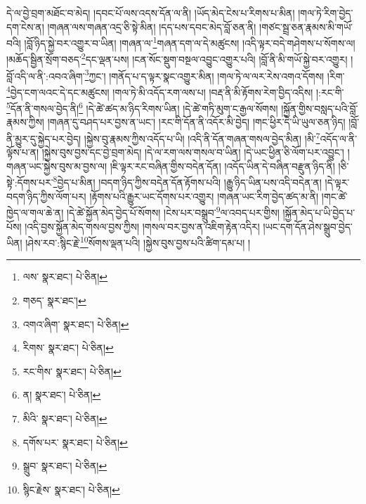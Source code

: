 དེ་ལ་བྱེ་བྲག་མཐོང་བ་མེད། །དབང་པོ་ལས་འདས་དོན་ལ་ནི། །ཡོད་མེད་ངེས་པ་རིགས་པ་མིན། །གལ་ཏེ་རིག་བྱེད་དག་ངེས་ན། །གཞན་ལས་གཞན་འདྲ་ཅི་སྟེ་མིན། །དད་པས་དབང་མེད་བློ་ཅན་ནི། །གཙང་སྦྲ་ཅན་རྣམས་མི་གཡོ་བའི། །བློ་ཉིད་སྐྱེ་བར་འགྱུར་བ་ཡིན། །གཞན་ལ་\footnote{ལས་  སྣར་ཐང་།  པེ་ཅིན། }གཞན་དག་ལ་དེ་མཚུངས། །འདི་ལྟར་བདེ་གཤེགས་པ་སོགས་ལ། །མཆོད་སྦྱིན་སྲོག་བཅད་\footnote{གཅད་  སྣར་ཐང་། }དང་ལྡན་པས། །ངན་སོང་སྡུག་བསྔལ་འབྱུང་འགྱུར་པའི། །བློ་ནི་མི་གཡོ་སྐྱེ་བར་འགྱུར། །བློ་འདི་ལ་ནི་:འབའ་ཞིག་\footnote{འགའ་ཞིག་  སྣར་ཐང་།  པེ་ཅིན། }ཀྱང་། །གནོད་པ་ད་ལྟར་སྣང་འགྱུར་མིན། །གལ་ཏེ་ལ་ལར་རེས་འགའ་དོགས། །རིག་\footnote{རིགས་  སྣར་ཐང་།  པེ་ཅིན། }བྱེད་ངག་ལའང་དེ་དང་མཚུངས། །གལ་ཏེ་མི་འདོད་རག་ལས་པ། །བརྡ་ནི་མི་རྟོགས་རེག་བྱིད་འདིས། །:རང་གི་\footnote{རང་གིས་  སྣར་ཐང་།  པེ་ཅིན། }དོན་ནི་གསལ་བྱེད་ནི།\footnote{ན།  སྣར་ཐང་།  པེ་ཅིན། } །དེ་ཚེ་ཚད་མ་ཉིད་རིགས་ཡིན། །དེ་ཚེ་གཏི་མུག་ང་རྒྱལ་སོགས། །སྐྱོན་གྱིས་བསླད་པའི་བློ་རྣམས་ཀྱིས། །གཞན་དུ་བཤད་པར་བྱས་ན་ཡང་། །རང་གི་དོན་ནི་འདོར་མི་བྱེད། །གང་ཕྱིར་དེ་ཡི་ཡུལ་ཅན་ཉིད། །བློ་ནི་མྱུར་དུ་སྐྱེད་པར་བྱེད། །སྐྱེས་བུ་རྣམས་ཀྱིས་འདོད་པ་ཡི། །འདི་ནི་དོན་གཞན་གསལ་བྱེད་མིན། །མི་\footnote{མིའི་  སྣར་ཐང་།  པེ་ཅིན། }འདོད་ལ་ནི་ལྟོས་པ་ན། །སྐྱེས་བུས་བྱས་དང་བྱེ་བྲག་མེད། །དེ་ལ་རག་ལས་གསལ་བ་ཡིན། །དེ་ཡང་ཕྱིན་ཅི་ལོག་པར་འབྱུང་། །གཞན་ཡང་སྐྱེས་བུས་མ་བྱས་ལ། །ཇི་ལྟར་རང་བཞིན་གྱིས་བདེན་དོན། །འདོད་ཡིན་དེ་བཞིན་བརྫུན་ཉིད་ནི། །ཅི་སྟེ་:དོགས་པར་\footnote{དགོས་པར་  སྣར་ཐང་།  པེ་ཅིན། }བྱེད་པ་མིན། །བདག་ཉིད་ཀྱིས་བདེན་དོན་རྟོགས་པའི། །རྒྱུ་ཉིད་ཡིན་པས་འདི་བདེན་ན། །དེ་ལྟར་བདག་ཉིད་ཀྱིས་ལོག་པར། །རྟོགས་པའི་རྒྱུར་ཡང་དོགས་པར་འགྱུར། །གཞན་ཡང་རིག་བྱེད་ཚད་མ་ནི། །གང་ཚེ་ཁྱེད་ལ་གལ་ཆེ་ན། །དེ་ཚེ་སྐྱོན་མེད་བྱེད་པོ་སོགས། །ངེས་པར་བསྒྲུབ་\footnote{སྒྲུབ་  སྣར་ཐང་།  པེ་ཅིན། }ལ་འབད་པར་གྱིས། །སྐྱོན་མེད་པ་ཡི་བྱེད་པ་པོས། །འདི་བྱས་སྐྱོན་མེད་གསལ་བྱས་ཀྱིས། །གསལ་བར་བྱས་ན་འཇིག་རྟེན་འདིར། །ཡང་དག་དོན་ཤེས་སྒྲུབ་བྱེད་ཡིན། །ཤེས་རབ་:སྙིང་རྗེ་\footnote{སྙིང་རྗེས་  སྣར་ཐང་།  པེ་ཅིན། }སོགས་ལྡན་པའི། །སྐྱེས་བུས་བྱས་པའི་ཚིག་དམ་པ། །
